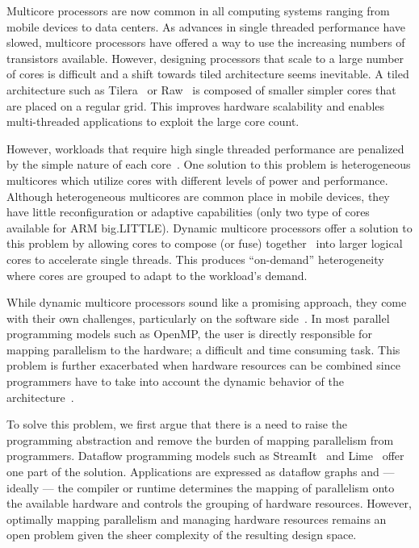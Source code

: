 
Multicore processors are now common in all computing systems ranging from mobile devices to data centers.
As advances in single threaded performance have slowed, multicore processors have offered a way to use the increasing numbers of transistors available.
However, designing processors that scale to a large number of cores is difficult and a shift towards tiled architecture seems inevitable.
A tiled architecture such as Tilera~\cite{bell2008tile} or Raw~\cite{waingold1997raw} is composed of smaller simpler cores that are placed on a regular grid.
This improves hardware scalability and enables multi-threaded applications to exploit the large core count.

However, workloads that require high single threaded performance are penalized by the simple nature of each core~\cite{eyerman2010amdahl}.
One solution to this problem is heterogeneous multicores which utilize cores with different levels of power and performance.
Although heterogeneous multicores are common place in mobile devices, they have little reconfiguration or adaptive capabilities (\eg only two type of cores available for ARM big.LITTLE).
Dynamic multicore processors offer a solution to this problem by allowing cores to compose (or fuse) together~\cite{ipek2007CoreFusion} into larger logical cores to accelerate single threads.
This produces ``on-demand'' heterogeneity where cores are grouped to adapt to the workload's demand.

While dynamic multicore processors sound like a promising approach, they come with their own challenges, particularly on the software side~\cite{wells2009needfordmc}.
In most parallel programming models such as OpenMP, the user is directly responsible for mapping parallelism to the hardware; a difficult and time consuming task.
This problem is further exacerbated when hardware resources can be combined since programmers have to take into account the dynamic behavior of the architecture~\cite{bower2008impactd}.

To solve this problem, we first argue that there is a need to raise the programming abstraction and remove the burden of mapping parallelism from programmers.
Dataflow programming models such as StreamIt~\cite{theis2002streamit} and Lime~\cite{auerbach2012lime} offer one part of the solution.
Applications are expressed as dataflow graphs and --- ideally --- the compiler or runtime determines the mapping of parallelism onto the available hardware and controls the grouping of hardware resources.
However, optimally mapping parallelism and managing hardware resources remains an open problem given the sheer complexity of the resulting design space.

